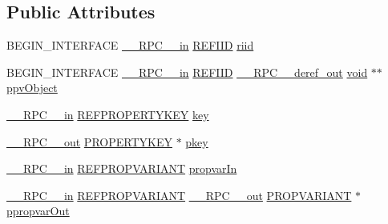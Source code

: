 \subsection*{Public Attributes}
\begin{DoxyCompactItemize}
\item 
B\+E\+G\+I\+N\+\_\+\+I\+N\+T\+E\+R\+F\+A\+CE \hyperlink{rpcsal_8h_a20b7f6da600a05c8b541659f14f7f0e6}{\+\_\+\+\_\+\+R\+P\+C\+\_\+\+\_\+in} \hyperlink{px__win__ds_8c_a80ec49c8ae61e234197d5071d2df497d}{R\+E\+F\+I\+ID} \hyperlink{struct_i_property_change_vtbl_a8a327cef89ca4a62bb79d22de5ccdb4b}{riid}
\item 
B\+E\+G\+I\+N\+\_\+\+I\+N\+T\+E\+R\+F\+A\+CE \hyperlink{rpcsal_8h_a20b7f6da600a05c8b541659f14f7f0e6}{\+\_\+\+\_\+\+R\+P\+C\+\_\+\+\_\+in} \hyperlink{px__win__ds_8c_a80ec49c8ae61e234197d5071d2df497d}{R\+E\+F\+I\+ID} \hyperlink{rpcsal_8h_a23bc188526f10656f9c79d950f6c3192}{\+\_\+\+\_\+\+R\+P\+C\+\_\+\+\_\+deref\+\_\+out} \hyperlink{sound_8c_ae35f5844602719cf66324f4de2a658b3}{void} $\ast$$\ast$ \hyperlink{struct_i_property_change_vtbl_a404c4df654c43f6fec7a70be06ead309}{ppv\+Object}
\item 
\hyperlink{rpcsal_8h_a20b7f6da600a05c8b541659f14f7f0e6}{\+\_\+\+\_\+\+R\+P\+C\+\_\+\+\_\+in} \hyperlink{propkeydef_8h_a3e01280fe3a0b979f5a1926d5a8754af}{R\+E\+F\+P\+R\+O\+P\+E\+R\+T\+Y\+K\+EY} \hyperlink{struct_i_property_change_vtbl_a210a1167b7e191886de51265a78101dd}{key}
\item 
\hyperlink{rpcsal_8h_aa518a2c78d44d75f3685c32c455c5ed8}{\+\_\+\+\_\+\+R\+P\+C\+\_\+\+\_\+out} \hyperlink{pa__win__wasapi_8c_aa83c2fbe06e13eff5ff331ba4a302659}{P\+R\+O\+P\+E\+R\+T\+Y\+K\+EY} $\ast$ \hyperlink{struct_i_property_change_vtbl_a115c49fa8919d94c46b97bdc92a7d527}{pkey}
\item 
\hyperlink{rpcsal_8h_a20b7f6da600a05c8b541659f14f7f0e6}{\+\_\+\+\_\+\+R\+P\+C\+\_\+\+\_\+in} \hyperlink{propidl_8h_ac8a8bd0f5f7f9b7e9f8e6fd4fd039fda}{R\+E\+F\+P\+R\+O\+P\+V\+A\+R\+I\+A\+NT} \hyperlink{struct_i_property_change_vtbl_ad9b06bcd77801dbb64de01bfaf923ec1}{propvar\+In}
\item 
\hyperlink{rpcsal_8h_a20b7f6da600a05c8b541659f14f7f0e6}{\+\_\+\+\_\+\+R\+P\+C\+\_\+\+\_\+in} \hyperlink{propidl_8h_ac8a8bd0f5f7f9b7e9f8e6fd4fd039fda}{R\+E\+F\+P\+R\+O\+P\+V\+A\+R\+I\+A\+NT} \hyperlink{rpcsal_8h_aa518a2c78d44d75f3685c32c455c5ed8}{\+\_\+\+\_\+\+R\+P\+C\+\_\+\+\_\+out} \hyperlink{propidl_8h_ae902c1757cd16052896846fa4ebb88d8}{P\+R\+O\+P\+V\+A\+R\+I\+A\+NT} $\ast$ \hyperlink{struct_i_property_change_vtbl_aae85111e853632af672090643d493226}{ppropvar\+Out}
\end{DoxyCompactItemize}


